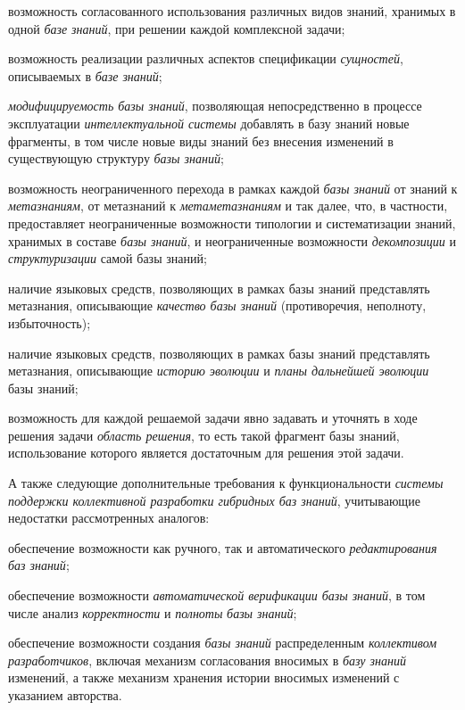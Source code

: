 \begin{textitemize}
\item возможность согласованного использования различных видов знаний, хранимых в одной \textit{базе знаний}, при решении каждой комплексной задачи;

\item возможность реализации различных аспектов спецификации \textit{сущностей}, описываемых в \textit{базе знаний};

\item \textit{модифицируемость базы знаний}, позволяющая непосредственно в процессе эксплуатации \textit{интеллектуальной системы} добавлять в базу знаний новые фрагменты, в том числе новые виды знаний без внесения изменений в существующую структуру \textit{базы знаний};

\item возможность неограниченного перехода в рамках каждой \textit{базы знаний} от знаний к \textit{метазнаниям}, от метазнаний к \textit{метаметазнаниям} и так далее, что, в частности, предоставляет неограниченные возможности типологии и систематизации знаний, хранимых в составе \textit{базы знаний}, и неограниченные возможности \textit{декомпозиции} и \textit{структуризации} самой базы знаний;

\item наличие языковых средств, позволяющих в рамках базы знаний представлять метазнания, описывающие \textit{качество базы знаний} (противоречия, неполноту, избыточность);

\item наличие языковых средств, позволяющих в рамках базы знаний представлять метазнания, описывающие \textit{историю эволюции} и \textit{планы дальнейшей эволюции} базы знаний;

\item возможность для каждой решаемой задачи явно задавать и уточнять в ходе решения задачи \textit{область решения}, то есть такой фрагмент базы знаний, использование которого является достаточным для решения этой задачи.
\end{textitemize}

А также следующие дополнительные требования к функциональности \textit{системы поддержки коллективной разработки гибридных баз знаний}, учитывающие недостатки рассмотренных аналогов:

\begin{textitemize}
\item обеспечение возможности как ручного, так и автоматического \textit{редактирования баз знаний};

\item обеспечение возможности \textit{автоматической верификации базы знаний}, в том числе анализ \textit{корректности} и \textit{полноты} \textit{базы знаний};

\item обеспечение возможности создания \textit{базы знаний} распределенным \textit{коллективом разработчиков}, включая механизм согласования вносимых в \textit{базу знаний} изменений, а также механизм хранения истории вносимых изменений с указанием авторства.
\end{textitemize}

